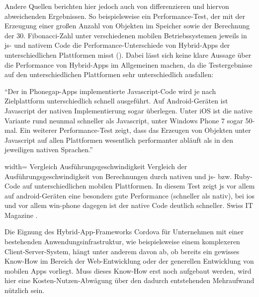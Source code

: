 Andere Quellen berichten hier jedoch auch von differenzieren und hiervon abweichenden Ergebnissen. 
So beispielsweise ein Performance-Test, der mit der Erzeugung einer großen Anzahl von Objekten im Speicher sowie der Berechnung der 30. Fibonacci-Zahl unter verschiedenen mobilen Betriebssystemen jeweils in \gls{js}- und nativem Code die Performance-Unterschiede von Hybrid-Apps der unterschiedlichen Plattformen misst ().
Dabei lässt sich keine klare Aussage über die Performance von Hybrid-Apps im Allgemeinen machen, da die Testergebnisse auf den unterschiedlichen Plattformen sehr unterschiedlich ausfallen:

\begin{quoting}
	\enquote{Der in Phonegap-Apps implementierte Javascript-Code wird je nach Zielplattform unterschiedlich schnell ausgeführt. Auf Android-Geräten ist Javascript der nativen Implementierung sogar überlegen. Unter iOS ist die native Variante rund neunmal schneller als Javascript, unter Windows Phone 7 sogar 50-mal. Ein weiterer Performance-Test zeigt, dass das Erzeugen von Objekten unter Javascript auf allen Plattformen wesentlich performanter abläuft als in den jeweiligen nativen Sprachen.}~\cite{Eine_App_fr_alle_Plattformen_-_IT_Magazine}
\end{quoting}
	
	{width=\fullimagesize}
	{Vergleich Ausführungsgeschwindigkeit}
	{Vergleich der Ausführungsgeschwindigkeit von Berechnungen durch nativen und \gls{js}- bzw. Ruby-Code auf unterschiedlichen mobilen Plattformen. In diesem Test zeigt \gls{js} vor allem auf \gls{android}-Geräten eine besonders gute Performance (schneller als nativ), bei \gls{ios} und vor allem \gls{win-phone} dagegen ist der native Code deutlich schneller.}
	{Swiss IT Magazine \cite{PerformanceTabelle}.}



Die Eignung des Hybrid-App-Frameworks Cordova für Unternehmen mit einer bestehenden Anwendungsinfrastruktur, wie beispielsweise einem komplexeren Client-Server-System, hängt unter anderem davon ab, ob bereits ein gewisses Know-How im Bereich der Web-Entwicklung oder der generellen Entwicklung von mobilen Apps vorliegt. 
Muss dieses Know-How erst noch aufgebaut werden, wird hier eine Kosten-Nutzen-Abwägung über den dadurch entstehenden Mehraufwand nützlich sein.

